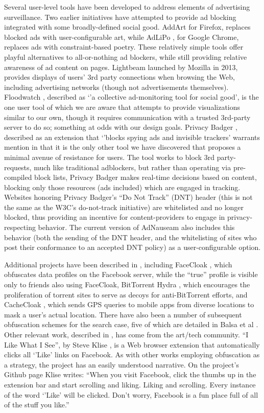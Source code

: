 \documentclass[conference]{IEEEtran}
\begin{document}
Several user-level tools have been developed to address elements of advertising surveillance. Two earlier initiatives have attempted to provide ad blocking integrated with some broadly-defined social good. AddArt \cite{AddArt} for Firefox, replaces blocked ads with user-configurable art, while AdLiPo \cite{Howe-0}, for Google Chrome, replaces ads with constraint-based poetry. These relatively simple tools offer playful alternatives to all-or-nothing ad blockers, while still providing relative awareness of ad content on pages. Lightbeam \cite{Mozilla} launched by Mozilla in 2013, provides displays of users' 3rd party connections when browsing the Web, including advertising networks (though not advertisements themselves). Floodwatch \cite{Floodwatch}, described as `'a collective ad-monitoring tool for social good', is the one user tool of which we are aware that attempts to provide visualizations similar to our own, though it requires communication with a trusted 3rd-party server to do so; something at odds with our design goals. Privacy Badger \cite{EFF}, described as an extension that `'blocks spying ads and invisible trackers' warrants mention in that it is the only other tool we have discovered that proposes a minimal avenue of resistance for users. The tool works to block 3rd party-requests, much like traditional adblockers, but rather than operating via pre-compiled block lists, Privacy Badger makes real-time decisions based on content, blocking only those resources (ads included) which are engaged in tracking. Websites honoring Privacy Badger's ``Do Not Track'' (DNT) header (this is not the same as the W3C's do-not-track initiative) are whitelisted and no longer blocked, thus providing an incentive for content-providers to engage in privacy-respecting behavior. The current version of AdNauseam also includes this behavior (both the sending of the DNT header, and the whitelisting of sites who post their conformance to an accepted DNT policy) as a user-configurable option.

Additional projects have been described in \cite{Brunton}, including FaceCloak \cite{Luo}, which obfuscates data profiles on the Facebook server, while the ``true'' profile is visible only to friends also using FaceCloak,  BitTorrent Hydra \cite{Schulze}, which encourages the proliferation of torrent sites to serve as decoys for anti-BitTorrent efforts, and CacheCloak \cite{Meyerowitz}, which sends GPS queries to mobile apps from diverse locations to mask a user's actual location. There have also been a number of subsequent obfuscation schemes for the search case, five of which are detailed in Balsa et al \cite{Balsa}. Other relevant work, described in \cite{Howe-3}, has come from the art/tech community. ``I Like What I See'', by Steve Klise \cite{Klise}, is a Web browser extension that automatically clicks all `'Like' links on Facebook. As with other works employing obfuscation as a strategy, the project has an easily understood narrative. On the project's Github page Klise writes: ``When you visit Facebook, click the thumbs up in the extension bar and start scrolling and liking. Liking and scrolling. Every instance of the word `'Like' will be clicked. Don't worry, Facebook is a fun place full of all of the stuff you like.''
\end{document}
